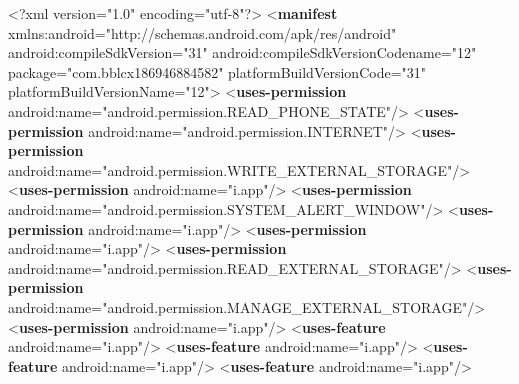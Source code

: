 \documentclass[
]{article}
\newenvironment{Shaded}{}{}
\newcommand{\FunctionTok}[1]{\textcolor[rgb]{0.02,0.16,0.49}{#1}}
\newcommand{\KeywordTok}[1]{\textcolor[rgb]{0.00,0.44,0.13}{\textbf{#1}}}
\newcommand{\NormalTok}[1]{#1}
\newcommand{\OtherTok}[1]{\textcolor[rgb]{0.00,0.44,0.13}{#1}}
\newcommand{\StringTok}[1]{\textcolor[rgb]{0.25,0.44,0.63}{#1}}
\begin{document}
\begin{Shaded}
\begin{Highlighting}[]
\FunctionTok{\textless{}?xml}\OtherTok{ version=}\StringTok{"1.0"}\OtherTok{ encoding=}\StringTok{"utf{-}8"}\FunctionTok{?\textgreater{}}
\NormalTok{\textless{}}\KeywordTok{manifest}\OtherTok{ xmlns:android=}\StringTok{"http://schemas.android.com/apk/res/android"}\OtherTok{ android:compileSdkVersion=}\StringTok{"31"}\OtherTok{ android:compileSdkVersionCodename=}\StringTok{"12"}\OtherTok{ package=}\StringTok{"com.bblcx186946884582"}\OtherTok{ platformBuildVersionCode=}\StringTok{"31"}\OtherTok{ platformBuildVersionName=}\StringTok{"12"}\NormalTok{\textgreater{}}
\NormalTok{    \textless{}}\KeywordTok{uses{-}permission}\OtherTok{ android:name=}\StringTok{"android.permission.READ\_PHONE\_STATE"}\NormalTok{/\textgreater{}}
\NormalTok{    \textless{}}\KeywordTok{uses{-}permission}\OtherTok{ android:name=}\StringTok{"android.permission.INTERNET"}\NormalTok{/\textgreater{}}
\NormalTok{    \textless{}}\KeywordTok{uses{-}permission}\OtherTok{ android:name=}\StringTok{"android.permission.WRITE\_EXTERNAL\_STORAGE"}\NormalTok{/\textgreater{}}
\NormalTok{    \textless{}}\KeywordTok{uses{-}permission}\OtherTok{ android:name=}\StringTok{"i.app"}\NormalTok{/\textgreater{}}
\NormalTok{    \textless{}}\KeywordTok{uses{-}permission}\OtherTok{ android:name=}\StringTok{"android.permission.SYSTEM\_ALERT\_WINDOW"}\NormalTok{/\textgreater{}}
\NormalTok{    \textless{}}\KeywordTok{uses{-}permission}\OtherTok{ android:name=}\StringTok{"i.app"}\NormalTok{/\textgreater{}}
\NormalTok{    \textless{}}\KeywordTok{uses{-}permission}\OtherTok{ android:name=}\StringTok{"i.app"}\NormalTok{/\textgreater{}}
\NormalTok{    \textless{}}\KeywordTok{uses{-}permission}\OtherTok{ android:name=}\StringTok{"android.permission.READ\_EXTERNAL\_STORAGE"}\NormalTok{/\textgreater{}}
\NormalTok{    \textless{}}\KeywordTok{uses{-}permission}\OtherTok{ android:name=}\StringTok{"android.permission.MANAGE\_EXTERNAL\_STORAGE"}\NormalTok{/\textgreater{}}
\NormalTok{    \textless{}}\KeywordTok{uses{-}permission}\OtherTok{ android:name=}\StringTok{"i.app"}\NormalTok{/\textgreater{}}
\NormalTok{    \textless{}}\KeywordTok{uses{-}feature}\OtherTok{ android:name=}\StringTok{"i.app"}\NormalTok{/\textgreater{}}
\NormalTok{    \textless{}}\KeywordTok{uses{-}feature}\OtherTok{ android:name=}\StringTok{"i.app"}\NormalTok{/\textgreater{}}
\NormalTok{    \textless{}}\KeywordTok{uses{-}feature}\OtherTok{ android:name=}\StringTok{"i.app"}\NormalTok{/\textgreater{}}
\NormalTok{    \textless{}}\KeywordTok{uses{-}feature}\OtherTok{ android:name=}\StringTok{"i.app"}\NormalTok{/\textgreater{}}

\end{Highlighting}
\end{Shaded}
\end{document}
